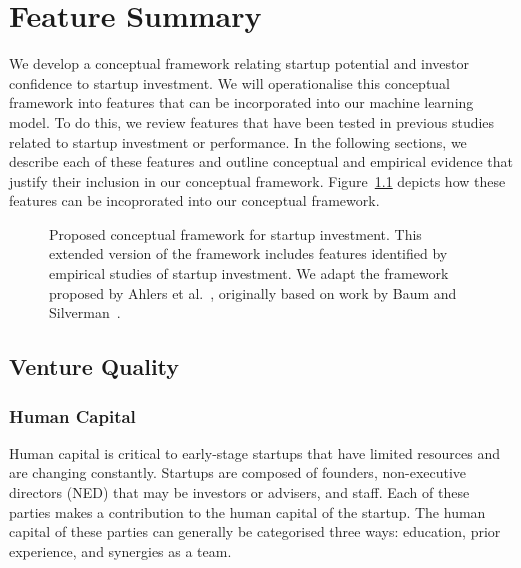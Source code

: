 \chapter{Feature Summary}
\label{appendix:feature_summary}

We develop a conceptual framework relating startup potential and investor confidence to startup investment. We will operationalise this conceptual framework into features that can be incorporated into our machine learning model. To do this, we review features that have been tested in previous studies related to startup investment or performance. In the following sections, we describe each of these features and outline conceptual and empirical evidence that justify their inclusion in our conceptual framework. Figure~\ref{fig:appendix:features:framework} depicts how these features can be incoprorated into our conceptual framework.

\begin{figure}[!htbp]
\centering

\caption{Proposed conceptual framework for startup investment. This extended version of the framework includes features identified by empirical studies of startup investment. We adapt the framework proposed by Ahlers et al.~\cite{ahlers2015}, originally based on work by Baum and Silverman~\cite{baum2004}.}
\label{fig:appendix:features:framework}
\end{figure}

\section{Venture Quality}

\subsection{Human Capital}

Human capital is critical to early-stage startups that have limited resources and are changing constantly. Startups are composed of founders, non-executive directors (NED) that may be investors or advisers, and staff. Each of these parties makes a contribution to the human capital of the startup. The human capital of these parties can generally be categorised three ways: education, prior experience, and  synergies as a team.

